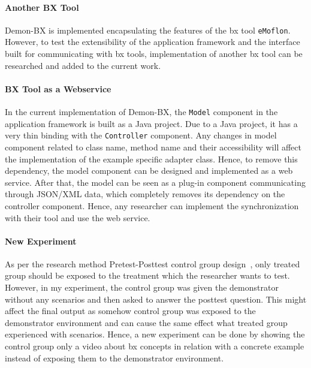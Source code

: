 \paragraph{Another BX Tool}
Demon-BX is implemented encapsulating the features of the bx tool \texttt{eMoflon}. However, to test the extensibility of the application framework and the interface built for communicating with bx tools, implementation of another bx tool can be researched and added to the current work.

\paragraph{BX Tool as a Webservice}
In the current implementation of Demon-BX, the \texttt{Model} component in the application framework is built as a Java project. Due to a Java project, it has a very thin binding with the \texttt{Controller} component. Any changes in model component related to class name, method name and their accessibility will affect the implementation of the example specific adapter class. Hence, to remove this dependency, the model component can be designed and implemented as a web service. After that, the model can be seen as a plug-in component communicating through JSON/XML data, which completely removes its dependency on the controller component. Hence, any researcher can implement the synchronization with their tool and use the web service.

\paragraph{New Experiment}
As per the research method Pretest-Posttest control group design~\cite{expandquasiexpdesign}, only treated group should be exposed to the treatment which the researcher wants to test. However, in my experiment, the control group was given the demonstrator without any scenarios and then asked to answer the posttest question. This might affect the final output as somehow control group was exposed to the demonstrator environment and can cause the same effect what treated group experienced with scenarios. Hence, a new experiment can be done by showing the control group only a video about bx concepts in relation with a concrete example instead of exposing them to the demonstrator environment.





